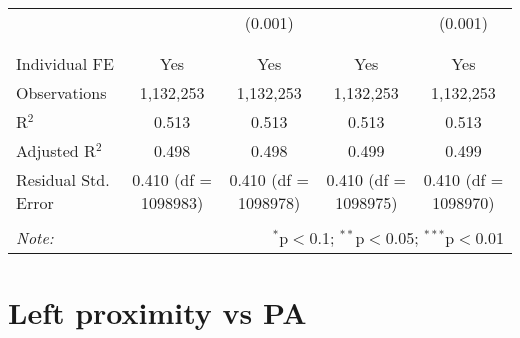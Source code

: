 \documentclass[
]{article}
\begin{document}
\begin{table}[!htbp]
{\begin{tabular}{@{\extracolsep{5pt}}lcccc}
  &  & (0.001) &  & (0.001) \\ 
  & & & & \\ 
\hline \\[-1.8ex] 
Individual FE & Yes & Yes & Yes & Yes \\ 
Observations & 1,132,253 & 1,132,253 & 1,132,253 & 1,132,253 \\ 
R$^{2}$ & 0.513 & 0.513 & 0.513 & 0.513 \\ 
Adjusted R$^{2}$ & 0.498 & 0.498 & 0.499 & 0.499 \\ 
Residual Std. Error & 0.410 (df = 1098983) & 0.410 (df = 1098978) & 0.410 (df = 1098975) & 0.410 (df = 1098970) \\ 
\hline 
\hline \\[-1.8ex] 
\textit{Note:}  & \multicolumn{4}{r}{$^{*}$p$<$0.1; $^{**}$p$<$0.05; $^{***}$p$<$0.01} \\ 
\end{tabular}
} 
\end{table} 
\newpage
\section{Left proximity vs PA}
\end{document}

